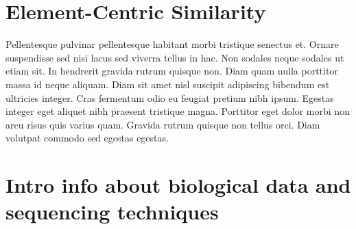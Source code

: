 \section{Element-Centric Similarity}

Pellentesque pulvinar pellentesque habitant morbi tristique senectus et. Ornare suspendisse sed nisi lacus sed viverra tellus in hac. Non sodales neque sodales ut etiam sit. In hendrerit gravida rutrum quisque non. Diam quam nulla porttitor massa id neque aliquam. Diam sit amet nisl suscipit adipiscing bibendum est ultricies integer. Cras fermentum odio eu feugiat pretium nibh ipsum. Egestas integer eget aliquet nibh praesent tristique magna. Porttitor eget dolor morbi non arcu risus quis varius quam. Gravida rutrum quisque non tellus orci. Diam volutpat commodo sed egestas egestas.

\section{Intro info about biological data and sequencing techniques}